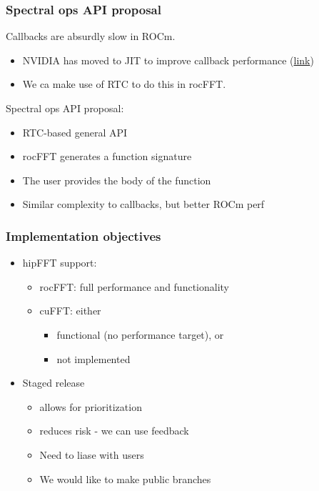 \documentclass[10pt,aspectratio=169]{beamer}
\begin{document}
\begin{frame}
  \frametitle{Spectral ops API proposal}

  Callbacks are absurdly slow in ROCm.
  \begin{itemize}
  \item NVIDIA has moved to JIT to improve callback performance (\href{https://www.nvidia.com/en-us/on-demand/session/gtcfall21-a31155/?playlistId=playList-ead11304-9931-4e91-9d5a-fb0e1ef27014}{link})
  \item We ca make use of RTC to do this in rocFFT.
  \end{itemize}

  \bigskip
  
  Spectral ops API proposal:
  \begin{itemize}
  \item RTC-based general API
  \item rocFFT generates a function signature
  \item The user provides the body of the function
  \item Similar complexity to callbacks, but better ROCm perf
  \end{itemize}
  
\end{frame}

\begin{frame}
  \frametitle{Implementation objectives}

  \begin{itemize}
  \item hipFFT support:
    \begin{itemize}
    \item rocFFT: full performance and functionality
    \item cuFFT: either
      \begin{itemize}
      \item functional (no performance target), or
      \item not implemented
      \end{itemize}
    \end{itemize}
  \end{itemize}

  \medskip
  
  \begin{itemize}
  \item Staged release
    \begin{itemize}
    \item allows for prioritization
    \item reduces risk - we can use feedback
    \item Need to liase with users
    \item We would like to make public branches
    \end{itemize}
  \end{itemize}
  
\end{frame}
\end{document}
